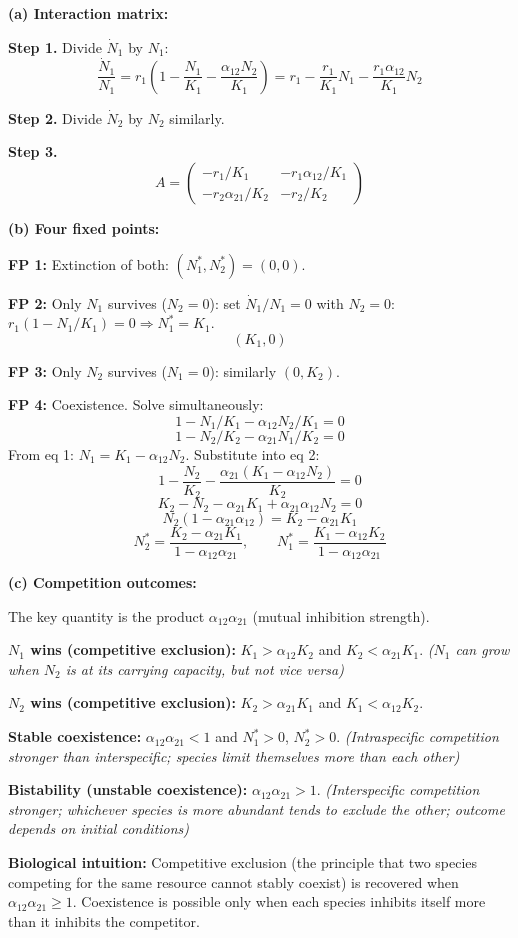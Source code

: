 \documentclass[10pt]{article}
\newcommand{\stepwhy}[1]{\textcolor{blue!60!black}{\small\textit{(#1)}}}
\begin{document}
\begin{solution}
\textbf{(a) Interaction matrix:}

\textbf{Step 1.} Divide $\dot N_1$ by $N_1$:
\[
\frac{\dot N_1}{N_1} = r_1\left(1 - \frac{N_1}{K_1} - \frac{\alpha_{12}N_2}{K_1}\right) = r_1 - \frac{r_1}{K_1}N_1 - \frac{r_1\alpha_{12}}{K_1}N_2
\]

\textbf{Step 2.} Divide $\dot N_2$ by $N_2$ similarly.

\textbf{Step 3.}
\[
A = \begin{pmatrix} -r_1/K_1 & -r_1\alpha_{12}/K_1 \\ -r_2\alpha_{21}/K_2 & -r_2/K_2 \end{pmatrix}
\]

\medskip\textbf{(b) Four fixed points:}

\textbf{FP 1:} Extinction of both: $(N_1^*, N_2^*) = (0, 0)$.

\textbf{FP 2:} Only $N_1$ survives ($N_2 = 0$): set $\dot N_1/N_1 = 0$ with $N_2 = 0$: $r_1(1 - N_1/K_1) = 0 \Rightarrow N_1^* = K_1$.
\[
(K_1, 0)
\]

\textbf{FP 3:} Only $N_2$ survives ($N_1 = 0$): similarly $(0, K_2)$.

\textbf{FP 4:} Coexistence. Solve simultaneously:
\[
1 - N_1/K_1 - \alpha_{12}N_2/K_1 = 0
\]
\[
1 - N_2/K_2 - \alpha_{21}N_1/K_2 = 0
\]
From eq 1: $N_1 = K_1 - \alpha_{12}N_2$.
Substitute into eq 2:
\[
1 - \frac{N_2}{K_2} - \frac{\alpha_{21}(K_1 - \alpha_{12}N_2)}{K_2} = 0
\]
\[
K_2 - N_2 - \alpha_{21}K_1 + \alpha_{21}\alpha_{12}N_2 = 0
\]
\[
N_2(1 - \alpha_{21}\alpha_{12}) = K_2 - \alpha_{21}K_1
\]
\[
N_2^* = \frac{K_2 - \alpha_{21}K_1}{1 - \alpha_{12}\alpha_{21}}, \qquad N_1^* = \frac{K_1 - \alpha_{12}K_2}{1 - \alpha_{12}\alpha_{21}}
\]

\medskip\textbf{(c) Competition outcomes:}

The key quantity is the product $\alpha_{12}\alpha_{21}$ (mutual inhibition strength).

\textbf{$N_1$ wins (competitive exclusion):} $K_1 > \alpha_{12}K_2$ and $K_2 < \alpha_{21}K_1$.
\stepwhy{$N_1$ can grow when $N_2$ is at its carrying capacity, but not vice versa}

\textbf{$N_2$ wins (competitive exclusion):} $K_2 > \alpha_{21}K_1$ and $K_1 < \alpha_{12}K_2$.

\textbf{Stable coexistence:} $\alpha_{12}\alpha_{21} < 1$ and $N_1^* > 0$, $N_2^* > 0$.
\stepwhy{Intraspecific competition stronger than interspecific; species limit themselves more than each other}

\textbf{Bistability (unstable coexistence):} $\alpha_{12}\alpha_{21} > 1$.
\stepwhy{Interspecific competition stronger; whichever species is more abundant tends to exclude the other; outcome depends on initial conditions}

\textbf{Biological intuition:} Competitive exclusion (the principle that two species competing for the same resource cannot stably coexist) is recovered when $\alpha_{12}\alpha_{21} \geq 1$. Coexistence is possible only when each species inhibits itself more than it inhibits the competitor.
\end{solution}
\end{document}
